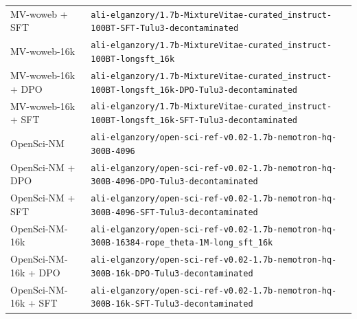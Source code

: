 \begin{table}[ht]
\begin{tabular}{lp{10cm}}
MV-woweb + SFT & \texttt{ali-\allowbreak{}elganzory/\allowbreak{}1.7b-\allowbreak{}MixtureVitae-\allowbreak{}curated\_instruct-\allowbreak{}100BT-\allowbreak{}SFT-\allowbreak{}Tulu3-\allowbreak{}decontaminated} \\
MV-woweb-16k & \texttt{ali-\allowbreak{}elganzory/\allowbreak{}1.7b-\allowbreak{}MixtureVitae-\allowbreak{}curated\_instruct-\allowbreak{}100BT-\allowbreak{}longsft\_16k} \\
MV-woweb-16k + DPO & \texttt{ali-\allowbreak{}elganzory/\allowbreak{}1.7b-\allowbreak{}MixtureVitae-\allowbreak{}curated\_instruct-\allowbreak{}100BT-\allowbreak{}longsft\_16k-\allowbreak{}DPO-\allowbreak{}Tulu3-\allowbreak{}decontaminated} \\
MV-woweb-16k + SFT & \texttt{ali-\allowbreak{}elganzory/\allowbreak{}1.7b-\allowbreak{}MixtureVitae-\allowbreak{}curated\_instruct-\allowbreak{}100BT-\allowbreak{}longsft\_16k-\allowbreak{}SFT-\allowbreak{}Tulu3-\allowbreak{}decontaminated} \\
OpenSci-NM & \texttt{ali-\allowbreak{}elganzory/\allowbreak{}open-\allowbreak{}sci-\allowbreak{}ref-\allowbreak{}v0.02-\allowbreak{}1.7b-\allowbreak{}nemotron-\allowbreak{}hq-\allowbreak{}300B-\allowbreak{}4096} \\
OpenSci-NM + DPO & \texttt{ali-\allowbreak{}elganzory/\allowbreak{}open-\allowbreak{}sci-\allowbreak{}ref-\allowbreak{}v0.02-\allowbreak{}1.7b-\allowbreak{}nemotron-\allowbreak{}hq-\allowbreak{}300B-\allowbreak{}4096-\allowbreak{}DPO-\allowbreak{}Tulu3-\allowbreak{}decontaminated} \\
OpenSci-NM + SFT & \texttt{ali-\allowbreak{}elganzory/\allowbreak{}open-\allowbreak{}sci-\allowbreak{}ref-\allowbreak{}v0.02-\allowbreak{}1.7b-\allowbreak{}nemotron-\allowbreak{}hq-\allowbreak{}300B-\allowbreak{}4096-\allowbreak{}SFT-\allowbreak{}Tulu3-\allowbreak{}decontaminated} \\
OpenSci-NM-16k & \texttt{ali-\allowbreak{}elganzory/\allowbreak{}open-\allowbreak{}sci-\allowbreak{}ref-\allowbreak{}v0.02-\allowbreak{}1.7b-\allowbreak{}nemotron-\allowbreak{}hq-\allowbreak{}300B-\allowbreak{}16384-\allowbreak{}rope\_theta-\allowbreak{}1M-\allowbreak{}long\_sft\_16k} \\
OpenSci-NM-16k + DPO & \texttt{ali-\allowbreak{}elganzory/\allowbreak{}open-\allowbreak{}sci-\allowbreak{}ref-\allowbreak{}v0.02-\allowbreak{}1.7b-\allowbreak{}nemotron-\allowbreak{}hq-\allowbreak{}300B-\allowbreak{}16k-\allowbreak{}DPO-\allowbreak{}Tulu3-\allowbreak{}decontaminated} \\
OpenSci-NM-16k + SFT & \texttt{ali-\allowbreak{}elganzory/\allowbreak{}open-\allowbreak{}sci-\allowbreak{}ref-\allowbreak{}v0.02-\allowbreak{}1.7b-\allowbreak{}nemotron-\allowbreak{}hq-\allowbreak{}300B-\allowbreak{}16k-\allowbreak{}SFT-\allowbreak{}Tulu3-\allowbreak{}decontaminated} \\

\end{tabular}
\end{table}
